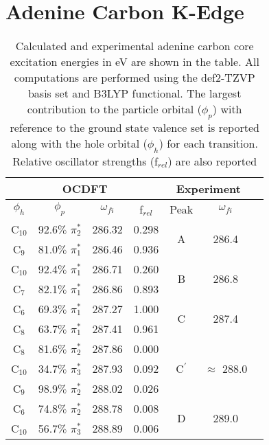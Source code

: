 \documentclass[12pt]{article}
\begin{document}
\section{Adenine Carbon K-Edge}
  \begin{table}[!h]
  \footnotesize
 	\centering
\caption{Calculated and experimental adenine carbon core excitation energies in eV are shown in the table. All computations are performed using the def2-TZVP basis set and B3LYP functional. The largest contribution to the particle orbital ($\phi_p$) with reference to the ground state valence set is reported along with the hole orbital ($\phi_h$) for each transition. Relative oscillator strengths (f$_{rel}$) are also reported}
     \begin{tabular}{c@{\hskip 0.22in}c@{\hskip 0.22in}c@{\hskip 0.22in}c@{\hskip 0.52in}c@{\hskip 0.22in}c@{\hskip 0.22in}c}
     \hline
     \hline
   \multicolumn{4}{c}{OCDFT} &\multicolumn{2}{c}{Experiment} \\
   \hline
 $\phi_h$ &  $\phi_p$ & $\omega_{fi}$ & f$_{rel}$ & Peak &  $\omega_{fi}$   \\
   \hline
    C$_{10}$
 &   92.6$\%$ $\pi_2^*$  & 286.32 & 0.298 & \multirow{2}{*}{A} & \multirow{2}{*}{286.4}\\
    C$_9$
 &   81.0$\%$ $\pi_1^*$  & 286.46 & 0.936 
 \vspace{0.1in}\\
    C$_{10}$
 &   92.4$\%$ $\pi_1^*$  & 286.71 & 0.260 &  \multirow{2}{*}{B} &  \multirow{2}{*}{286.8} \\
    C$_7$
 &   82.1$\%$ $\pi_1^*$  & 286.86 & 0.893 
 \vspace{0.1in}\\
    C$_6$
 &   69.3$\%$ $\pi_1^*$  & 287.27 & 1.000 &  \multirow{2}{*}{C} &  \multirow{2}{*}{287.4}\\
    C$_8$
 &   63.7$\%$ $\pi_1^*$  & 287.41 & 0.961 
 \vspace{0.1in}\\
    C$_8$
 &   81.6$\%$ $\pi_2^*$  & 287.86 & 0.000 &  \multirow{3}{*}{C$^{\prime}$} &  \multirow{3}{*}{$\approx$ 288.0}\\
    C$_{10}$
 &   34.7$\%$ $\pi_3^*$  & 287.93 & 0.092 \\
    C$_9$
 &   98.9$\%$ $\pi_2^*$
 & 288.02 & 0.026 
 \vspace{0.1in}\\
    C$_6$
 &   74.8$\%$ $\pi_2^*$  & 288.78 & 0.008 & \multirow{5}{*}{D} & \multirow{5}{*}{289.0} \\
    C$_{10}$
 &   56.7$\%$ $\pi_3^*$  & 288.89 & 0.006 \\

\end{tabular}
\end{table}
\end{document}

